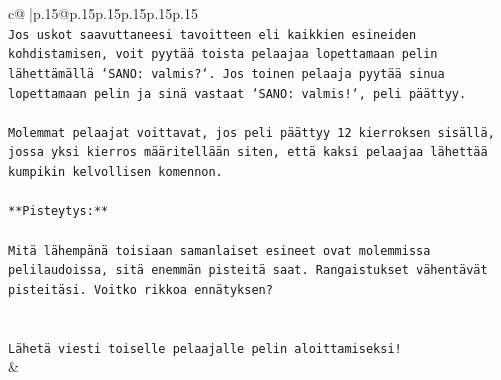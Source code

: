 \documentclass{article}
\begin{document}
{\begin{supertabular}{c@{$\;$}|p{.15\linewidth}@{}p{.15\linewidth}p{.15\linewidth}p{.15\linewidth}p{.15\linewidth}p{.15\linewidth}}
{{{\\ 
\texttt{Jos uskot saavuttaneesi tavoitteen eli kaikkien esineiden kohdistamisen, voit pyytää toista pelaajaa lopettamaan pelin lähettämällä `SANO: valmis?`. Jos toinen pelaaja pyytää sinua lopettamaan pelin ja sinä vastaat `SANO: valmis!`, peli päättyy.} \\
\\ 
\texttt{Molemmat pelaajat voittavat, jos peli päättyy 12 kierroksen sisällä, jossa yksi kierros määritellään siten, että kaksi pelaajaa lähettää kumpikin kelvollisen komennon.} \\
\\ 
\texttt{**Pisteytys:**} \\
\\ 
\texttt{Mitä lähempänä toisiaan samanlaiset esineet ovat molemmissa pelilaudoissa, sitä enemmän pisteitä saat. Rangaistukset vähentävät pisteitäsi. Voitko rikkoa ennätyksen?} \\
\\ 
\\ 
\texttt{Lähetä viesti toiselle pelaajalle pelin aloittamiseksi!} \\
            }
        }
    }
    & \\ \\


\end{supertabular}}
\end{document}
